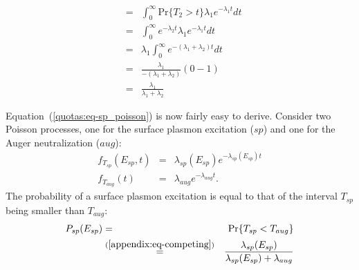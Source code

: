 \begin{refsection}
\begin{eqnarray}
                       &=& \int_0^\infty \text{Pr}\{T_2 > t\} \lambda_1 e^{-\lambda_1 t} dt \nonumber \\
                       &=& \int_0^\infty e^{-\lambda_2 t} \lambda_1 e^{-\lambda_1 t} dt \nonumber \\
                       &=& \lambda_1 \int_0^\infty e^{- (\lambda_1 + \lambda_2) t} dt \nonumber \\
                       &=& \frac{\lambda_1}{-(\lambda_1 + \lambda_2)} (0 - 1) \nonumber \\
                       &=& \frac{\lambda_1}{\lambda_1 + \lambda_2} \label{appendix:eq-competing}
\end{eqnarray} 

Equation~(\ref{quotas:eq-sp_poisson}) is now fairly easy to derive. Consider two 
Poisson processes, one for the surface plasmon excitation ($sp$) and one for
the Auger neutralization ($aug$):
\begin{eqnarray*} 
f_{T_{sp}}(E_{sp}, t) &=& \lambda_{sp} (E_{sp}) e^{-\lambda_{sp}(E_{sp}) t}\\ 
f_{T_{aug}}(t) &=& \lambda_{aug} e^{-\lambda_{aug} t}.
\end{eqnarray*}
The probability of a surface plasmon excitation is equal to that of the 
interval $T_{sp}$ being smaller than $T_{aug}$:
\begin{eqnarray} 
P_{sp}(E_{sp}) &=& \text{Pr}\{T_{sp} < T_{aug}\} \nonumber \\
               &\stackrel{(\ref{appendix:eq-competing})}{=}& \frac{\lambda_{sp} (E_{sp}) }{\lambda_{sp} (E_{sp})  + \lambda_{aug}} \\
\end{eqnarray} 


\end{refsection}
